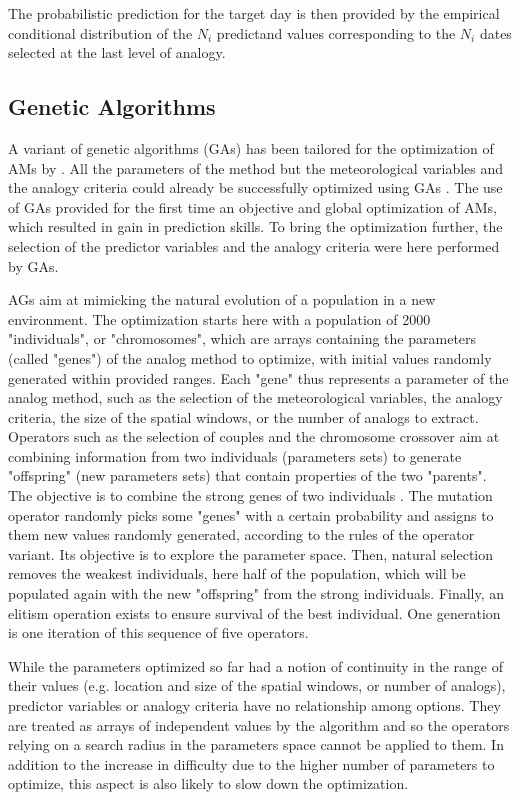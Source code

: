 \documentclass[draft]{agujournal2019}
\begin{document}
The probabilistic prediction for the target day is then provided by the empirical conditional distribution of the $N_{i}$ predictand values corresponding to the $N_{i}$ dates selected at the last level of analogy.


\subsection{Genetic Algorithms}
\label{gas}

A variant of genetic algorithms (GAs) has been tailored for the optimization of AMs by . All the parameters of the method but the meteorological variables and the analogy criteria could already be successfully optimized using GAs \cite{Horton2018a}. The use of GAs provided for the first time an objective and global optimization of AMs, which resulted in gain in prediction skills. To bring the optimization further, the selection of the predictor variables and the analogy criteria were here performed by GAs. 

AGs aim at mimicking the natural evolution of a population in a new environment. The optimization starts here with a population of 2000 "individuals", or "chromosomes", which are arrays containing the parameters (called "genes") of the analog method to optimize, with initial values randomly generated within provided ranges. Each "gene" thus represents a parameter of the analog method, such as the selection of the meteorological variables, the analogy criteria, the size of the spatial windows, or the number of analogs to extract. Operators such as the selection of couples and the chromosome crossover aim at combining information from two individuals (parameters sets) to generate "offspring" (new parameters sets) that contain properties of the two "parents". The objective is to combine the strong genes of two individuals \cite{Holland1992b}. The mutation operator randomly picks some "genes" with a certain probability and assigns to them new values randomly generated, according to the rules of the operator variant. Its objective is to explore the parameter space. Then, natural selection removes the weakest individuals, here half of the population, which will be populated again with the new "offspring" from the strong individuals. Finally, an elitism operation exists to ensure survival of the best individual. One generation is one iteration of this sequence of five operators.





While the parameters optimized so far had a notion of continuity in the range of their values (e.g. location and size of the spatial windows, or number of analogs), predictor variables or analogy criteria have no relationship among options. They are treated as arrays of independent values by the algorithm and so the operators relying on a search radius in the parameters space \cite{Horton2017a} cannot be applied to them. In addition to the increase in difficulty due to the higher number of parameters to optimize, this aspect is also likely to slow down the optimization.
\end{document}
